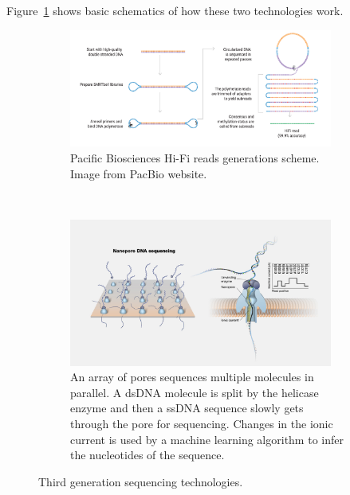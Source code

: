 Figure~\ref{fig:sequencing_technologies} shows basic schematics of how these two technologies work.\\ 
\begin{figure}[!ht]
	\centering
	\begin{subfigure}[b]{0.95\textwidth}
		\centering
		\includegraphics[width=0.95\textwidth]{figures/background/hifi_pacbio.png}
		\caption{Pacific Biosciences Hi-Fi reads generations scheme. Image from PacBio website.} 
	\end{subfigure}%
	\\
	\begin{subfigure}[b]{0.95\textwidth}
		\centering
		\includegraphics[width=0.95\textwidth]{figures/background/nanopore_sequencing.jpg}
		\caption{An array of pores sequences multiple molecules in parallel. A dsDNA molecule is split by the helicase enzyme and then a ssDNA sequence slowly gets through the pore for sequencing. Changes in the ionic current is used by a machine learning algorithm to infer the nucleotides of the sequence.} 
	\end{subfigure}%
	\caption{Third generation sequencing technologies.}
	\label{fig:sequencing_technologies}
\end{figure}

